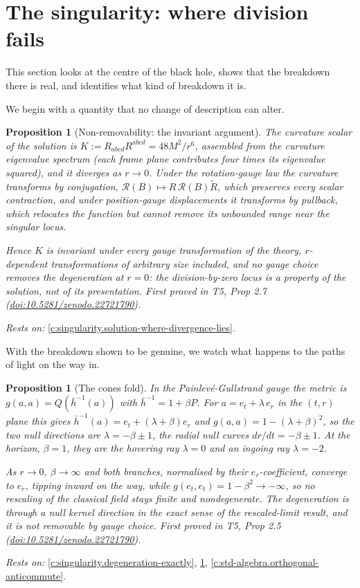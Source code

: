 \documentclass[11pt]{article}
\newtheorem{proposition}[theorem]{Proposition}
\theoremstyle{definition}
\theoremstyle{plain}
\providecommand{\er}{}\renewcommand{\er}{e_r}
\providecommand{\et}{}\renewcommand{\et}{e_t}
\providecommand{\hb}{}\renewcommand{\hb}{\bar{h}}
\begin{document}
\section{The singularity: where division fails}

This section looks at the centre of the black hole, shows that the breakdown there is real, and identifies what kind of breakdown it is.

We begin with a quantity that no change of description can alter.

\begin{proposition}[Non-removability: the invariant argument]\label{c:singularity.non-removability-invariant-argument}
The curvature scalar of the solution is $K := R_{abcd}R^{abcd} = 48M^2/r^6$, assembled from the curvature eigenvalue spectrum (each frame plane contributes four times its eigenvalue squared), and it diverges as $r \to 0$. Under the rotation-gauge law the curvature transforms by conjugation, $\mathcal{R}(B) \mapsto R\,\mathcal{R}(B)\tilde R$, which preserves every scalar contraction, and under position-gauge displacements it transforms by pullback, which relocates the function but cannot remove its unbounded range near the singular locus.

Hence $K$ is invariant under every gauge transformation of the theory, $r$-dependent transformations of arbitrary size included, and no gauge choice removes the degeneration at $r = 0$: the division-by-zero locus is a property of the solution, not of its presentation.
\emph{First proved in} T5, Prop 2.7 (\href{https://doi.org/10.5281/zenodo.22721790}{doi:10.5281/zenodo.22721790}).
\end{proposition}
\noindent\emph{Rests on:} \ref{c:singularity.solution-where-divergence-lies}.

With the breakdown shown to be genuine, we watch what happens to the paths of light on the way in.

\begin{proposition}[The cones fold]\label{c:singularity.cones-fold}
In the Painlev\'e-Gullstrand gauge the metric is $g(a,a) = Q(\hb^{-1}(a))$ with $\hb^{-1} = 1 + \beta P$. For $a = \et + \lambda\,\er$ in the $(t,r)$ plane this gives $\hb^{-1}(a) = \et + (\lambda + \beta)\er$ and $g(a,a) = 1 - (\lambda + \beta)^2$, so the two null directions are $\lambda = -\beta \pm 1$, the radial null curves $dr/dt = -\beta \pm 1$. At the horizon, $\beta = 1$, they are the hovering ray $\lambda = 0$ and an ingoing ray $\lambda = -2$.

As $r \to 0$, $\beta \to \infty$ and both branches, normalised by their $\er$-coefficient, converge to $\er$, tipping inward on the way, while $g(\et,\et) = 1 - \beta^2 \to -\infty$, so no rescaling of the classical field stays finite and nondegenerate. The degeneration is through a null kernel direction in the exact sense of the rescaled-limit result, and it is not removable by gauge choice.
\emph{First proved in} T5, Prop 2.5 (\href{https://doi.org/10.5281/zenodo.22721790}{doi:10.5281/zenodo.22721790}).
\end{proposition}
\noindent\emph{Rests on:} \ref{c:singularity.degeneration-exactly}, \ref{c:singularity.non-removability-invariant-argument}, \ref{c:std-algebra.orthogonal-anticommute}.
\end{document}
